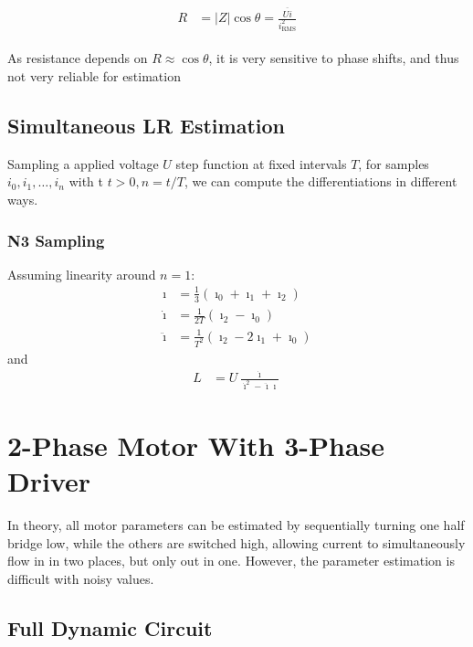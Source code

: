 \documentclass[12pt,a4paper,oneside,openany]{article}
\begin{document}
\begin{gather}
\begin{aligned}
R &= |Z| \cos \theta = \frac{\overline{U i}}{i_{\textrm{RMS}}^2}
\end{aligned}
\end{gather}

As resistance depends on $R \approx \cos \theta$, it is very sensitive to phase shifts, and thus not very reliable for estimation


\subsection{Simultaneous LR Estimation}

Sampling a  applied voltage $U$ step function at fixed intervals $T$, for samples $i_0, i_1, \ldots, i_n$ with t $t>0,n=t/T$, we can compute the differentiations in different ways.

\subsubsection{N3 Sampling}

Assuming linearity around $n=1$:
\begin{align}
{\imath} &= \frac{1}{3} (\imath_0 + \imath_1 + \imath_2) \\
\dot{\imath} &= \frac{1}{2T} (\imath_2 - \imath_0) \\
\ddot{\imath} &= \frac{1}{T^2} (\imath_2 - 2\imath_1 + \imath_0)
\end{align}
and
\begin{align}
L &= U \frac{\dot{\imath}}{\dot{\imath}^2 - \ddot{\imath} \imath}
\end{align}



\section[2Ph Mot w/ 3Ph Driver]{2-Phase Motor With 3-Phase Driver}

In theory, all motor parameters can be estimated by sequentially turning one half bridge low, while the others are switched high, allowing current to simultaneously flow in in two places, but only out in one. However, the parameter estimation is difficult with noisy values.

\subsection{Full Dynamic Circuit}
\end{document}
